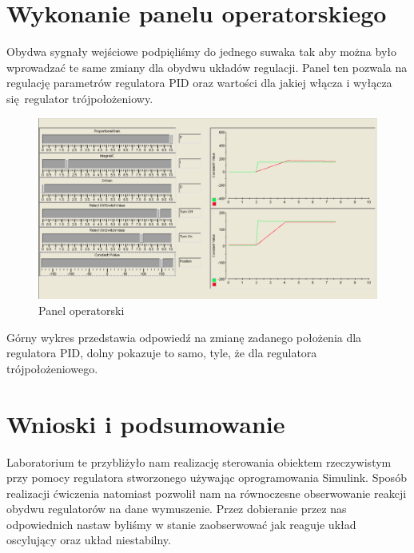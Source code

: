 \documentclass[a4paper, 12pt, titlepage]{article}
\begin{document}
	\section{Wykonanie panelu operatorskiego}
		Obydwa sygnały wejściowe podpięliśmy do jednego suwaka tak aby można było wprowadzać te same zmiany dla obydwu układów regulacji. Panel ten pozwala na regulację parametrów regulatora PID oraz wartości dla jakiej włącza i wyłącza się regulator trójpołożeniowy.
		\begin{figure}[H]
			\includegraphics[width=\textwidth]{img/operational_panel.png}
			\caption{Panel operatorski}
		\end{figure}\noindent
		Górny wykres przedstawia odpowiedź na zmianę zadanego położenia dla regulatora PID, dolny pokazuje to samo, tyle, że dla regulatora trójpołożeniowego.
	\section{Wnioski i podsumowanie}
		Laboratorium te przybliżyło nam realizację sterowania obiektem rzeczywistym przy pomocy regulatora stworzonego używając oprogramowania Simulink. Sposób realizacji ćwiczenia natomiast pozwolił nam na równoczesne obserwowanie reakcji obydwu regulatorów na dane wymuszenie. Przez dobieranie przez nas odpowiednich nastaw byliśmy w stanie zaobserwować jak reaguje układ oscylujący oraz układ niestabilny.
\end{document}

